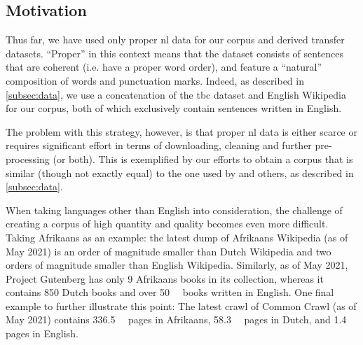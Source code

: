 \subsection{Motivation}
\label{subsec:composition_of_transfer_dataset_motivation}
Thus far, we have used only proper \gls{nl} data for our corpus and derived transfer datasets. ``Proper'' in this context means that the dataset consists of sentences that are coherent (i.e. have a proper word order), and feature a ``natural'' composition of words and punctuation marks. Indeed, as described in \cref{subsec:data}, we use a concatenation of the \gls{tbc} dataset and English Wikipedia for our corpus, both of which exclusively contain sentences written in English.

The problem with this strategy, however, is that proper \gls{nl} data is either scarce or requires significant effort in terms of downloading, cleaning and further pre-processing (or both). This is exemplified by our efforts to obtain a corpus that is similar (though not exactly equal) to the one used by \citet{devlin2018bert,sanh2019distilbert} and others, as described in \cref{subsec:data}.

When taking languages other than English into consideration, the challenge of creating a corpus of high quantity and quality becomes even more difficult. Taking Afrikaans as an example: the latest dump of Afrikaans Wikipedia (as of May 2021) is an order of magnitude smaller than Dutch Wikipedia and two orders of magnitude smaller than English Wikipedia. Similarly, as of May 2021, Project Gutenberg has only 9 Afrikaans books in its collection, whereas it contains 850 Dutch books and over \SI{50}{\kilo\nothing} books written in English. One final example to further illustrate this point: The latest crawl of Common Crawl (as of May 2021) contains \SI{336.5}{\kilo\nothing} pages in Afrikaans, \SI{58.3}{\mega\nothing} pages in Dutch, and \SI{1.4}{\billion} pages in English.

